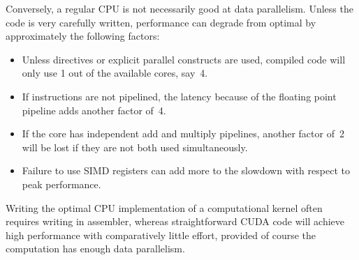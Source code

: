 Conversely, a regular CPU is not necessarily good at data
parallelism. Unless the code is very carefully written, performance
can degrade from optimal by approximately the following factors:
\begin{itemize}
\item Unless directives or explicit parallel constructs are used,
  compiled code will only use 1 out of the available cores, say~4.
\item If instructions are not pipelined, the latency because of the
  floating point pipeline adds another factor of~4.
\item If the core has independent add and multiply pipelines, another
  factor of~2 will be lost if they are not both used simultaneously.
\item Failure to use SIMD registers can add more to the slowdown with
  respect to peak performance.
\end{itemize}
Writing the optimal CPU implementation of a computational kernel often
requires writing in assembler, whereas straightforward CUDA code will
achieve high performance with comparatively little effort, provided of
course the computation has enough data parallelism.

\endinput
Each SM has a 8192 entry register file = 32Kbyte,
otoh, shared memory on the SM is only 16Kbyte

A kernel is spawned on a (1d,2d) \emph{grid} of (1d,2d,3d) 
\emph{thread blocks}. 
Within a thread block:
- synchronization
- data sharing
Different thread blocks can not cooperate or synchronize.

Identification:
- block ID (1d,2d)
- thread ID (1d,2d,3d)

Memory
- per thread registers and local memory
- per block shared memory
- per grid global memory, r/o constant memory, r/o texture memory
The host can r/w global/constant/texture memory


